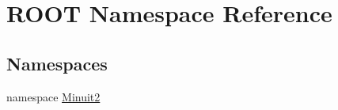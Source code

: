 \hypertarget{namespaceROOT}{
\section{ROOT Namespace Reference}
\label{d0/d10/namespaceROOT}
}
\subsection*{Namespaces}
\begin{DoxyCompactItemize}
\item 
namespace \hyperlink{namespaceROOT_1_1Minuit2}{Minuit2}
\end{DoxyCompactItemize}
